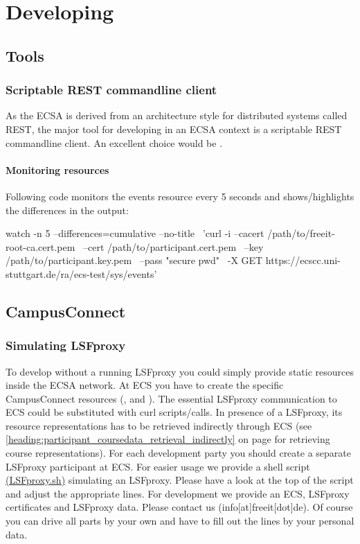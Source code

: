 \hypertarget{devel}{}
\hypertarget{developing}{}
\chapter{Developing}
\section{Tools}
\subsection{Scriptable REST commandline client}
As the ECSA is derived from an architecture style for distributed systems
called REST, the major tool for developing in an ECSA context is a scriptable
REST commandline client. An excellent choice would be .
\subsubsection{Monitoring resources}
Following code monitors the events resource every 5 seconds and
shows/highlights the differences in the output:
\begin{code}
watch -n 5 --differences=cumulative --no-title \
'curl -i --cacert /path/to/freeit-root-ca.cert.pem \
     --cert /path/to/participant.cert.pem \
     --key /path/to/participant.key.pem \
     --pass "secure pwd" \
     -X GET https://ecscc.uni-stuttgart.de/ra/ecs-test/sys/events'
\end{code}

\hypertarget{devel-campusconnect}{}
\section{CampusConnect}
\subsection{Simulating LSFproxy}
To develop without a running LSFproxy you could simply provide static resources
inside the ECSA network. At ECS you have to create the specific CampusConnect
resources (,  and
). The essential LSFproxy communication to ECS
could be substituted with curl scripts/calls. In presence of a LSFproxy, its
resource representations has to be retrieved indirectly through ECS (see
\ref{heading:participant_coursedata_retrieval_indirectly} on page
\pageref{heading:participant_coursedata_retrieval_indirectly} for retrieving
course representations). For each development party you should create a
separate LSFproxy participant at ECS. For easier usage we provide a shell script
\href{http://repo.or.cz/w/ecs.git/blob_plain/HEAD:/campusconnect/scripts/lsfproxy.sh}{(LSFproxy.sh)}
simulating an LSFproxy. Please have a look at the top of the script and adjust
the appropriate lines. For development we provide an ECS, LSFproxy certificates
and LSFproxy data. Please contact us (info[at]freeit[dot]de). Of course you can
drive all parts by your own and have to fill out the lines by your personal
data.

